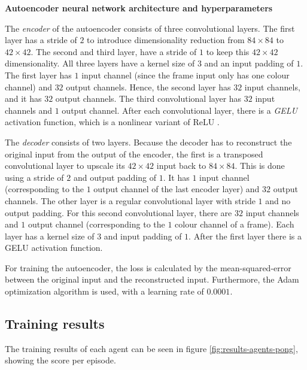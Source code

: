 \noindent \textbf{Autoencoder neural network architecture and hyperparameters}\par
\noindent The \emph{encoder} of the autoencoder consists of three convolutional layers. The first layer has a stride of $2$ to introduce dimensionality reduction from $84 \times 84$ to $42 \times 42$. The second and third layer, have a stride of $1$ to keep this $42 \times 42$ dimensionality. All three layers have a kernel size of $3$ and an input padding of $1$. The first layer has $1$ input channel (since the frame input only has one colour channel) and $32$ output channels. Hence, the second layer has $32$ input channels, and it has $32$ output channels. The third convolutional layer has $32$ input channels and $1$ output channel. After each convolutional layer, there is a \emph{GELU} activation function, which is a nonlinear variant of ReLU \cite{gelu}.

The \emph{decoder} consists of two layers. Because the decoder has to reconstruct the original input from the output of the encoder, the first is a transposed convolutional layer to upscale its $42 \times 42$ input back to $84 \times 84$. This is done using a stride of $2$ and output padding of $1$. It has $1$ input channel (corresponding to the $1$ output channel of the last encoder layer) and $32$ output channels. The other layer is a regular convolutional layer with stride $1$ and no output padding. For this second convolutional layer, there are $32$ input channels and $1$ output channel (corresponding to the $1$ colour channel of a frame). Each layer has a kernel size of $3$ and input padding of $1$. After the first layer there is a GELU activation function.

For training the autoencoder, the loss is calculated by the mean-squared-error between the original input and the reconstructed input. Furthermore, the Adam optimization algorithm is used, with a learning rate of $0.0001$. 

\subsection{Training results}
The training results of each agent can be seen in figure \ref{fig:results-agents-pong}, showing the score per episode.

